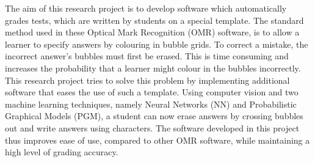


\begin{abstracts}        %
The aim of this research project is to develop software which automatically grades tests, which are written by students on a special template. The standard method used in these Optical Mark Recognition (OMR) software, is to allow a learner to specify answers by colouring in bubble grids. To correct a mistake, the incorrect answer's bubbles must first be erased. This is time consuming and increases the probability that a learner might colour in the bubbles incorrectly. This research project tries to solve this problem by implementing additional software that eases the use of such a template. Using computer vision and two machine learning techniques, namely Neural Networks (NN) and Probabilistic Graphical Models (PGM), a student can now erase answers by crossing bubbles out and write answers using characters. The software developed in this project thus improves ease of use, compared to other OMR software, while maintaining a high level of grading accuracy.
\end{abstracts}
